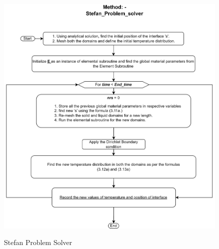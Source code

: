 \begin{figure}[htb]
  \centering
  \includegraphics[width=13cm]{img/Stefan_Problem.png}\\
  \caption{Stefan Problem Solver}
  \label{fig:Stefan Problem Solver}
\end{figure}
